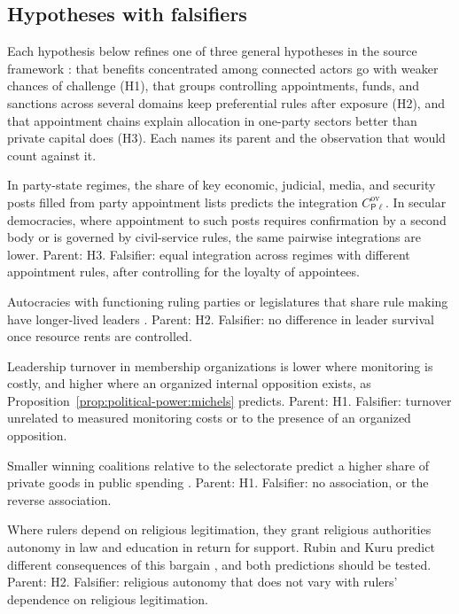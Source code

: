 \documentclass[11pt,letterpaper]{article}
\theoremstyle{definition}
\theoremstyle{remark}
\newcommand{\pP}{\mathsf{P}}
\begin{document}
\subsection{Hypotheses with falsifiers}

Each hypothesis below refines one of three general hypotheses in the source framework \citep[Section~9]{largo2026hbs}: that benefits concentrated among connected actors go with weaker chances of challenge (H1), that groups controlling appointments, funds, and sanctions across several domains keep preferential rules after exposure (H2), and that appointment chains explain allocation in one-party sectors better than private capital does (H3). Each names its parent and the observation that would count against it.

\begin{description}[font=\normalfont\itshape, leftmargin=1.5em, style=nextline]
\item[HP1, appointment channel.] In party-state regimes, the share of key economic, judicial, media, and security posts filled from party appointment lists predicts the integration $C^{\mathrm{ov}}_{\pP\ell}$. In secular democracies, where appointment to such posts requires confirmation by a second body or is governed by civil-service rules, the same pairwise integrations are lower. Parent: H3. Falsifier: equal integration across regimes with different appointment rules, after controlling for the loyalty of appointees.
\item[HP2, institutionalized power sharing.] Autocracies with functioning ruling parties or legislatures that share rule making have longer-lived leaders \citep{gandhi2007,magaloni2008}. Parent: H2. Falsifier: no difference in leader survival once resource rents are controlled.
\item[HP3, conditional oligarchy.] Leadership turnover in membership organizations is lower where monitoring is costly, and higher where an organized internal opposition exists, as Proposition~\ref{prop:political-power:michels} predicts. Parent: H1. Falsifier: turnover unrelated to measured monitoring costs or to the presence of an organized opposition.
\item[HP4, selectorate.] Smaller winning coalitions relative to the selectorate predict a higher share of private goods in public spending \citep{bdm2003}. Parent: H1. Falsifier: no association, or the reverse association.
\item[HP5, religious-political bargaining.] Where rulers depend on religious legitimation, they grant religious authorities autonomy in law and education in return for support. Rubin and Kuru predict different consequences of this bargain \citep{rubin2017,kuru2019}, and both predictions should be tested. Parent: H2. Falsifier: religious autonomy that does not vary with rulers' dependence on religious legitimation.

\end{description}
\end{document}
